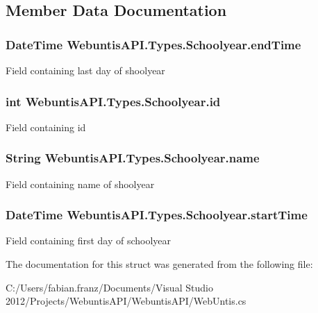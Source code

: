 \subsection{Member Data Documentation}
\hypertarget{struct_webuntis_a_p_i_1_1_types_1_1_schoolyear_ab90946531bc36b904e2a71b3ee44b03f}{
\subsubsection[{end\-Time}]{\setlength{\rightskip}{0pt plus 5cm}Date\-Time Webuntis\-A\-P\-I.\-Types.\-Schoolyear.\-end\-Time}}\label{struct_webuntis_a_p_i_1_1_types_1_1_schoolyear_ab90946531bc36b904e2a71b3ee44b03f}
Field containing last day of shoolyear \hypertarget{struct_webuntis_a_p_i_1_1_types_1_1_schoolyear_a5919885c6ffc12918b27fb9f13fd2c79}{
\subsubsection[{id}]{\setlength{\rightskip}{0pt plus 5cm}int Webuntis\-A\-P\-I.\-Types.\-Schoolyear.\-id}}\label{struct_webuntis_a_p_i_1_1_types_1_1_schoolyear_a5919885c6ffc12918b27fb9f13fd2c79}
Field containing id \hypertarget{struct_webuntis_a_p_i_1_1_types_1_1_schoolyear_a230844174db7f59e6536a2083ade0c41}{
\subsubsection[{name}]{\setlength{\rightskip}{0pt plus 5cm}String Webuntis\-A\-P\-I.\-Types.\-Schoolyear.\-name}}\label{struct_webuntis_a_p_i_1_1_types_1_1_schoolyear_a230844174db7f59e6536a2083ade0c41}
Field containing name of shoolyear \hypertarget{struct_webuntis_a_p_i_1_1_types_1_1_schoolyear_a137e91a773888c2c55dcbe153290e783}{
\subsubsection[{start\-Time}]{\setlength{\rightskip}{0pt plus 5cm}Date\-Time Webuntis\-A\-P\-I.\-Types.\-Schoolyear.\-start\-Time}}\label{struct_webuntis_a_p_i_1_1_types_1_1_schoolyear_a137e91a773888c2c55dcbe153290e783}
Field containing first day of schoolyear 

The documentation for this struct was generated from the following file\-:\begin{DoxyCompactItemize}
\item 
C\-:/\-Users/fabian.\-franz/\-Documents/\-Visual Studio 2012/\-Projects/\-Webuntis\-A\-P\-I/\-Webuntis\-A\-P\-I/Web\-Untis.\-cs\end{DoxyCompactItemize}
